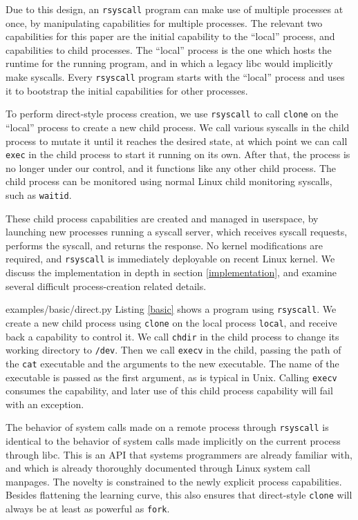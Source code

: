 \documentclass[letterpaper,twocolumn,10pt]{article}
\begin{document}
Due to this design, an \texttt{rsyscall} program can make use of multiple processes at once,
by manipulating capabilities for multiple processes.
The relevant two capabilities for this paper are the initial capability to the ``local'' process,
and capabilities to child processes.
The ``local'' process is the one which hosts the runtime for the running program,
and in which a legacy libc would implicitly make syscalls.
Every \texttt{rsyscall} program starts with the ``local'' process
and uses it to bootstrap the initial capabilities for other processes.

To perform direct-style process creation,
we use \texttt{rsyscall} to call \texttt{clone} on the ``local'' process to create a new child process.
We call various syscalls in the child process to mutate it until it reaches the desired state,
at which point we can call \texttt{exec} in the child process to start it running on its own.
After that, the process is no longer under our control, and it functions like any other child process.
The child process can be monitored using normal Linux child monitoring syscalls,
such as \texttt{waitid}.

These child process capabilities are created and managed in userspace,
by launching new processes running a syscall server,
which receives syscall requests, performs the syscall, and returns the response.
No kernel modifications are required, and \texttt{rsyscall} is immediately deployable on recent Linux kernel.
We discuss the implementation in depth in section \ref{implementation},
and examine several difficult process-creation related details.


{examples/basic/direct.py}
Listing \ref{basic} shows a program using \texttt{rsyscall}.
We create a new child process using \texttt{clone} on the local process \verb|local|,
and receive back a capability to control it.
We call \texttt{chdir} in the child process to change its working directory to \texttt{/dev}.
Then we call \texttt{execv} in the child,
passing the path of the \texttt{cat} executable
and the arguments to the new executable.
The name of the executable is passed as the first argument,
as is typical in Unix.
Calling \texttt{execv} consumes the capability,
and later use of this child process capability will fail with an exception.

The behavior of system calls made on a remote process through \texttt{rsyscall}
is identical to the behavior of system calls made implicitly on the current process through libc.
This is an API that systems programmers are already familiar with,
and which is already thoroughly documented through Linux system call manpages.
The novelty is constrained to the newly explicit process capabilities.
Besides flattening the learning curve,
this also ensures that direct-style \texttt{clone} will always be at least as powerful as \texttt{fork}.
\end{document}
